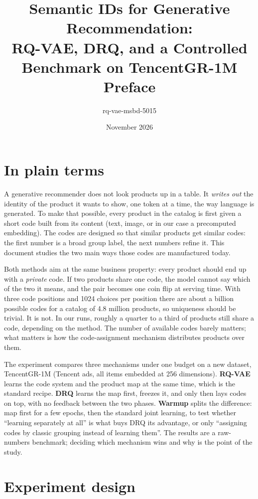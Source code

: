 \documentclass[11pt]{article}
\title{Semantic IDs for Generative Recommendation:\\
RQ-VAE, DRQ, and a Controlled Benchmark on TencentGR-1M\\
\large Preface}
\author{rq-vae-msbd-5015}
\date{November 2026}
\begin{document}
\maketitle

\section{In plain terms}

A generative recommender does not look products up in a table. It \emph{writes
out} the identity of the product it wants to show, one token at a time, the way
language is generated. To make that possible, every product in the catalog is
first given a short code built from its content (text, image, or in our case a
precomputed embedding). The codes are designed so that similar products get
similar codes: the first number is a broad group label, the next numbers refine
it. This document studies the two main ways those codes are manufactured today.

Both methods aim at the same business property: every product should end up with
a \emph{private} code. If two products share one code, the model cannot say
which of the two it means, and the pair becomes one coin flip at serving time.
With three code positions and 1024 choices per position there are about a
billion possible codes for a catalog of 4.8 million products, so uniqueness
should be trivial. It is not. In our runs, roughly a quarter to a third of
products still share a code, depending on the method. The number of available
codes barely matters; what matters is how the code-assignment mechanism
distributes products over them.

The experiment compares three mechanisms under one budget on a new dataset,
TencentGR-1M (Tencent ads, all items embedded at 256 dimensions).
\textbf{RQ-VAE} learns the code system and the product map at the same time,
which is the standard recipe. \textbf{DRQ} learns the map first, freezes it, and
only then lays codes on top, with no feedback between the two phases. \textbf{Warmup}
splits the difference: map first for a few epochs, then the standard joint
learning, to test whether ``learning separately at all'' is what buys DRQ its
advantage, or only ``assigning codes by classic grouping instead of learning
them''. The results are a raw-numbers benchmark; deciding which mechanism wins
and why is the point of the study.

\section{Experiment design}
\end{document}
